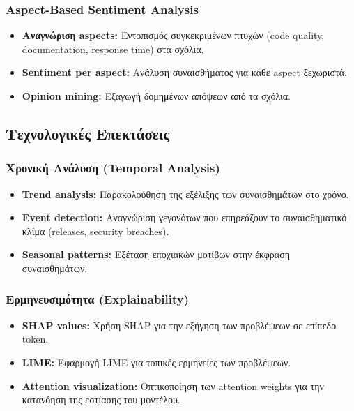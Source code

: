 \documentclass[a4paper,11pt,oneside,openany]{ioniothesis}
\begin{document}
\subsubsection{Aspect-Based Sentiment Analysis}

\begin{itemize}
    \item \textbf{Αναγνώριση aspects:} Εντοπισμός συγκεκριμένων πτυχών (code quality, documentation, response time) στα σχόλια.
    
    \item \textbf{Sentiment per aspect:} Ανάλυση συναισθήματος για κάθε aspect ξεχωριστά.
    
    \item \textbf{Opinion mining:} Εξαγωγή δομημένων απόψεων από τα σχόλια.
\end{itemize}

\subsection{Τεχνολογικές Επεκτάσεις}
\label{sec:Τεχνολογικές Επεκτάσεις}

\subsubsection{Χρονική Ανάλυση (Temporal Analysis)}

\begin{itemize}
    \item \textbf{Trend analysis:} Παρακολούθηση της εξέλιξης των συναισθημάτων στο χρόνο.
    
    \item \textbf{Event detection:} Αναγνώριση γεγονότων που επηρεάζουν το συναισθηματικό κλίμα (releases, security breaches).
    
    \item \textbf{Seasonal patterns:} Εξέταση εποχιακών μοτίβων στην έκφραση συναισθημάτων.
\end{itemize}

\subsubsection{Ερμηνευσιμότητα (Explainability)}

\begin{itemize}
    \item \textbf{SHAP values:} Χρήση SHAP για την εξήγηση των προβλέψεων σε επίπεδο token.
    
    \item \textbf{LIME:} Εφαρμογή LIME για τοπικές ερμηνείες των προβλέψεων.
    
    \item \textbf{Attention visualization:} Οπτικοποίηση των attention weights για την κατανόηση της εστίασης του μοντέλου.
\end{itemize}
\end{document}
